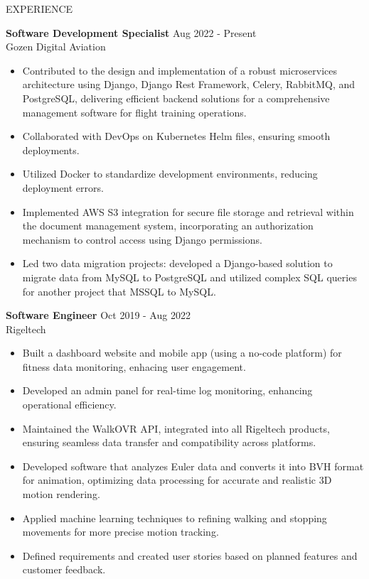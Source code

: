 \documentclass{resume} %
\begin{document}
\begin{rSection}{EXPERIENCE}

\textbf{Software Development Specialist} \hfill Aug 2022 - Present\\
Gozen Digital Aviation
 \begin{itemize}
    \itemsep -3pt {}
     \item Contributed to the design and implementation of a robust microservices architecture using Django, Django Rest Framework, Celery, RabbitMQ, and PostgreSQL, delivering efficient backend solutions for a comprehensive management software for flight training operations.
     \item Collaborated with DevOps on Kubernetes Helm files, ensuring smooth deployments.
    \item Utilized Docker to standardize development environments, reducing deployment errors.
    \item Implemented AWS S3 integration for secure file storage and retrieval within the document management system, incorporating an authorization mechanism to control access using Django permissions.
    \item Led two data migration projects: developed a Django-based solution to migrate data from MySQL to PostgreSQL and utilized complex SQL queries for another project that MSSQL to MySQL.
 \end{itemize}

\textbf{Software Engineer} \hfill Oct 2019 - Aug 2022\\
Rigeltech
 \begin{itemize}
    \itemsep -3pt {}
     \item Built a dashboard website and mobile app (using a no-code platform) for fitness data monitoring, enhacing user engagement.
     \item Developed an admin panel for real-time log monitoring, enhancing operational efficiency.
    \item Maintained the WalkOVR API, integrated into all Rigeltech products, ensuring seamless data transfer and compatibility across platforms.
   \item Developed software that analyzes Euler data and converts it into BVH format for animation, optimizing data processing for accurate and realistic 3D motion rendering.
    \item Applied machine learning techniques to refining walking and stopping movements for more precise motion tracking.
    \item Defined requirements and created user stories based on planned features and customer feedback.
 \end{itemize}


\end{rSection}
\end{document}
